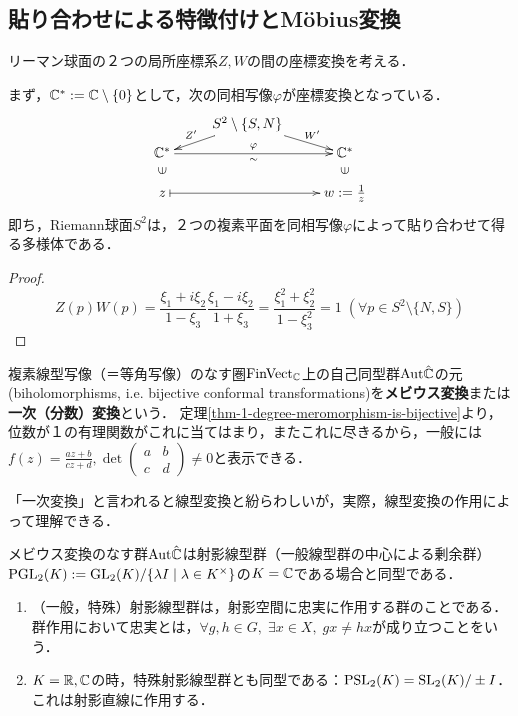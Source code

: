 \documentclass[uplatex, dvipdfmx]{jsreport}
\begin{document}
\subsection{貼り合わせによる特徴付けとMöbius変換}

リーマン球面の２つの局所座標系$Z,W$の間の座標変換を考える．
\begin{proposition}
    まず，$\mathbb{C}^*:=\mathbb{C}\setminus\{0\}$として，次の同相写像$\varphi$が座標変換となっている．
    \[\xymatrix@R-2pc{
        &{S^2\setminus\{S,N\}}\ar[ddl]_-{Z'}\ar[ddr]^-{W'}&\\
        { }&{ }&{ }\\
        \C^*\ar[rr]^-{\varphi}_-{\sim}&&\C^*\\
        \rotatebox{90}{$\in$}&&\rotatebox{90}{$\in$}\\
        z\ar@{|->}[rr]&&{w:=\frac{1}{z}}
    }\]
    即ち，Riemann球面$S^2$は，２つの複素平面を同相写像$\varphi$によって貼り合わせて得る多様体である．
\end{proposition}
\begin{proof}
    \[Z(p)W(p)=\frac{\xi_1+i\xi_2}{1-\xi_3}\frac{\xi_1-i\xi_2}{1+\xi_3}=\frac{\xi_1^2+\xi_2^2}{1-\xi_3^2}=1\;(\forall p\in S^2\setminus\{N,S\})\]
\end{proof}

\begin{definition}
    複素線型写像（＝等角写像）のなす圏$\mathrm{FinVect}_{\mathbb{C}}$上の自己同型群$\mathrm{Aut}{\hat{\mathbb{C}}}$の元(biholomorphisms, i.e. bijective conformal transformations)を\textbf{メビウス変換}または\textbf{一次（分数）変換}という．
    定理\ref{thm-1-degree-meromorphism-is-bijective}より，位数が１の有理関数がこれに当てはまり，またこれに尽きるから，一般には$f(z)=\frac{az+b}{cz+d}, \det\begin{pmatrix}a&b\\c&d\end{pmatrix}\ne 0$と表示できる．
\end{definition}

「一次変換」と言われると線型変換と紛らわしいが，実際，線型変換の作用によって理解できる．
\begin{proposition}
    メビウス変換のなす群$\mathrm{Aut}{\hat{\mathbb{C}}}$は射影線型群（一般線型群の中心による剰余群）$\mathrm{PGL}_2(K):=\mathrm{GL}_2(K)/\{\lambda I\mid \lambda\in K^\times\}$の$K=\mathbb{C}$である場合と同型である．
\end{proposition}
\begin{remark}\mbox{}
    \begin{enumerate}
        \item （一般，特殊）射影線型群は，射影空間に忠実に作用する群のことである．群作用において忠実とは，$\forall g,h\in G,\;\exists x\in X,\; gx\ne hx$が成り立つことをいう．
        \item $K=\mathbb{R},\mathbb{C}$の時，特殊射影線型群とも同型である：$\mathrm{PSL}_2(K)=\mathrm{SL}_2(K)/\pm I$．これは射影直線に作用する．
    \end{enumerate}
\end{remark}
\end{document}
